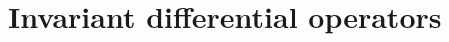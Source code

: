 \documentclass[12pt,a4paper,final]{report}
\begin{document}
%
%


\chapter{Invariant differential operators}
\end{document}
